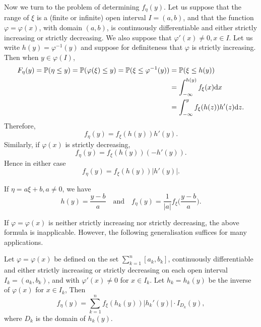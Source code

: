 Now we turn to the problem of determining $f_\eta(y)$. Let us suppose that the range of $\xi$ is a (finite or infinite) open interval $I = (a,b)$, and that the function $\varphi = \varphi(x)$, with domain $(a,b)$, is continuously differentiable and either strictly increasing or strictly decreasing. We also suppose that $\varphi'(x) \ne 0, x\in I$. Let us write $h(y) = \varphi^{-1}(y)$ and suppose for definiteness that $\varphi$ is strictly increasing. Then when $y \in \varphi(I)$,
\begin{align*}
    F_\eta(y) = \mathbb{P}(\eta \le y) = \mathbb{P}(\varphi(\xi) \le y) = \mathbb{P}(\xi \le \varphi^{-1}(y)) &= \mathbb{P}(\xi \le h(y))\\
    &= \int_{-\infty}^{h(y)}f_\xi(x) \mathrm{d} x\\
    &= \int_{-\infty}^y f_\xi(h(z))h'(z) \mathrm{d} z.
\end{align*}
Therefore,
\begin{equation}
    f_\eta(y) = f_\xi(h(y))h'(y).
\end{equation}
Similarly, if $\varphi(x)$ is strictly decreasing,
\begin{equation}
    f_\eta(y) = f_\xi(h(y))(-h'(y)).
\end{equation}
Hence in either case
\begin{equation}
    f_\eta(y) = f_\xi(h(y))|h'(y)|.
\end{equation}
\begin{example}
If $\eta = a\xi + b, a\ne 0$, we have
\begin{equation}
    h(y) = \frac{y-b}{a} \quad \text{and} \quad f_\eta(y) = \frac{1}{|a|}f_\xi\bigg(\frac{y-b}{a} \bigg).
\end{equation}
\end{example}
If $\varphi = \varphi(x)$ is neither strictly increasing nor strictly decreasing, the above formula is inapplicable. However, the following generalisation suffices for many applications.
\begin{lemma}
Let $\varphi = \varphi(x)$ be defined on the set $\sum_{k=1}^n[a_k, b_k]$, continuously differentiable and either strictly increasing or strictly decreasing on each open interval $I_k = (a_k, b_k)$, and with $\varphi'(x) \ne 0$ for $x \in I_k$. Let $h_k = h_k(y)$ be the inverse of $\varphi(x)$ for $x \in I_k$, Then
\begin{equation}
    f_\eta(y) = \sum_{k=1}^n f_\xi(h_k(y))|h_k'(y)|\cdot I_{D_k}(y),
\end{equation}
where $D_k$ is the domain of $h_k(y)$.
\end{lemma}
